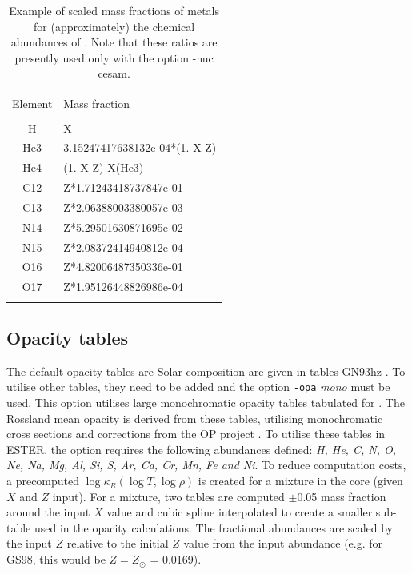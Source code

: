 \begin{table}[t]
    \centering
\begin{tabular}{c|l}
\hline
	   &   \\
	Element & Mass fraction \\
	   &   \\
        H  & X \\
        He3  & 3.15247417638132e-04*(1.-X-Z) \\
        He4  & (1.-X-Z)-X(He3) \\
        C12  & Z*1.71243418737847e-01 \\
        C13  & Z*2.06388003380057e-03 \\
        N14  & Z*5.29501630871695e-02 \\
        N15  & Z*2.08372414940812e-04 \\
        O16  & Z*4.82006487350336e-01 \\
        O17  & Z*1.95126448826986e-04 \\
	   &   \\
\hline
\end{tabular}
    \caption{Example of scaled mass fractions of metals for (approximately) the chemical
abundances of \cite{GS98}. Note that these ratios are presently used only with the option -nuc cesam.}
    \label{tab:exa_mf}
\end{table}

\subsection{Opacity tables} 

The default opacity tables are Solar composition are given in tables
GN93hz \citep{GN93}. To utilise other tables, they need to be
added and the option {\tt -opa} \textit{mono} must be
used. This option utilises large monochromatic opacity tables tabulated
for \cite{Mombarg2022}. The Rossland mean opacity is derived from these
tables, utilising monochromatic cross sections and corrections from
the OP project \citep{Seaton2005}. To utilise these tables in ESTER,
the option requires the following abundances defined: \textit{H, He,
C, N, O, Ne, Na, Mg, Al, Si, S, Ar, Ca, Cr, Mn, Fe and Ni}. To reduce
computation costs, a precomputed $\log\kappa_R(\log T,\log\rho)$
is created for a mixture in the core (given $X$ and $Z$ input). For a mixture,
two tables are computed $\pm$0.05 mass fraction around the input $X$ value
and cubic spline interpolated to create a smaller sub-table used in the
opacity calculations. The fractional abundances are scaled by the input $Z$
relative to the initial $Z$ value from the input abundance (e.g. for GS98,
this would be $Z = Z_\odot$ = 0.0169).


